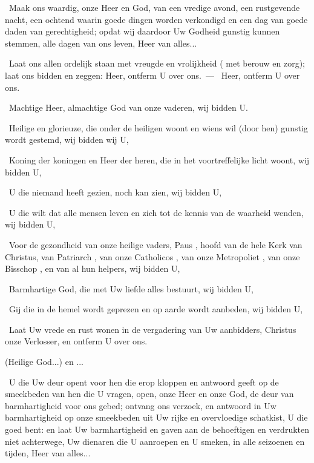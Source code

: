 \documentclass[12pt,twoside,a5paper]{article}
\begin{document}
\begin{halfparskip}\begin{sfpar}
  \cc~Maak ons waardig, onze Heer en God, van een vredige avond, een rustgevende nacht, een ochtend waarin goede dingen worden verkondigd en een dag van goede daden van gerechtigheid; opdat wij daardoor Uw Godheid gunstig kunnen stemmen, alle dagen van ons leven, Heer van alles...


  \dd~Laat ons allen ordelijk staan met vreugde en vrolijkheid ( met berouw en zorg); laat ons bidden en zeggen: Heer, ontferm U over ons.~--- \rr~Heer, ontferm U over ons. 

  \dd~Machtige Heer, almachtige God van onze vaderen, wij bidden U.

  \dd~Heilige en glorieuze, die onder de heiligen woont en wiens wil (door hen) gunstig wordt gestemd, wij bidden wij U,

  \dd~Koning der koningen en Heer der heren, die in het voortreffelijke licht woont, wij bidden U,

  \dd~U die niemand heeft gezien, noch kan zien, wij bidden U,

  \dd~U die wilt dat alle mensen leven en zich tot de kennis van de waarheid wenden, wij bidden U,

  \dd~Voor de gezondheid van onze heilige vaders, Paus \NN, hoofd van de hele Kerk van Christus, van Patriarch \NN, van onze Catholicos \NN, van onze Metropoliet \NN, van onze Bisschop \NN, en van al hun helpers, wij bidden U,

  \dd~Barmhartige God, die met Uw liefde alles bestuurt, wij bidden U,

  \dd~Gij die in de hemel wordt geprezen en op aarde wordt aanbeden, wij bidden U,

  \dd~Laat Uw vrede en rust wonen in de vergadering van Uw aanbidders, Christus onze Verlosser, en ontferm U over ons.

   (Heilige God...) en ...

  \cc~U die Uw deur opent voor hen die erop kloppen en antwoord geeft op de smeekbeden van hen die U vragen, open, onze Heer en onze God, de deur van barmhartigheid voor ons gebed; ontvang ons verzoek, en antwoord in Uw barmhartigheid op onze smeekbeden uit Uw rijke en overvloedige schatkist, U die goed bent: en laat Uw barmhartigheid en gaven aan de behoeftigen en verdrukten niet achterwege, Uw dienaren die U aanroepen en U smeken, in alle seizoenen en tijden, Heer van alles...


\end{sfpar}
\end{halfparskip}
\end{document}
